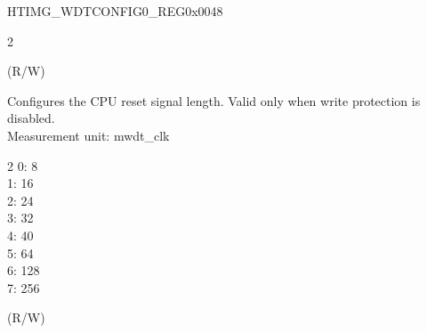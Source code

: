 \begin{register}{H}{TIMG\_WDTCONFIG0\_REG}{0x0048}
\begin{regdesc}
\begin{reglist}
\begin{multicols}{2}
\end{multicols}
(R/W)
\label{fielddesc:TIMGWDTCPURESETLENGTH}\item [TIMG\_WDT\_CPU\_RESET\_LENGTH] Configures the CPU reset signal length. Valid only when write protection is disabled.\\
Measurement unit: mwdt\_clk \\
\begin{multicols}{2}
0: 8 \\
1: 16 \\
2: 24 \\
3: 32 \\
4: 40 \\
5: 64 \\
6: 128 \\
7: 256 \\
\end{multicols} (R/W)

     \item [Continued on the next page...]
    \end{reglist}\end{regdesc}
    \end{register}
    \addtocounter{Regfloat}{-1}
